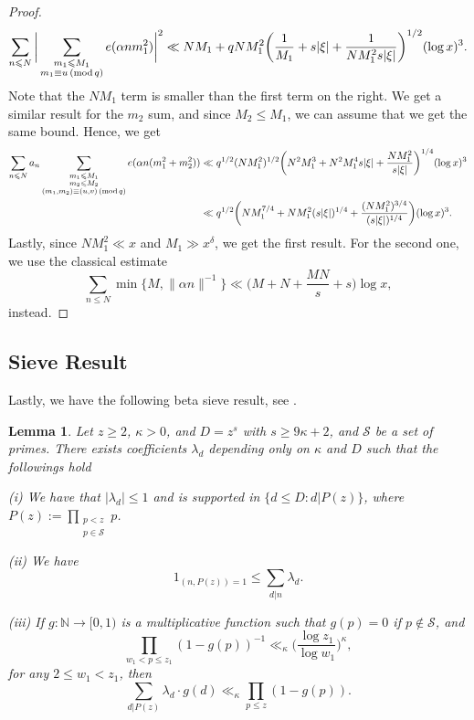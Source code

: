 \documentclass[12pt]{amsart}
\newtheorem{lem}[thm]{Lemma}
\theoremstyle{definition}
\theoremstyle{definition}
\theoremstyle{remark}
\numberwithin{equation}{section}
\newcommand{\N}{\mathbb{N}}
\newcommand{\CS}{\mathcal{S}}
\renewcommand{\geq}{\geqslant}
\renewcommand{\leq}{\leqslant}
\renewcommand{\mod}[1]{\,({\rm mod}\,#1)}
\begin{document}
\begin{proof}
$$ \sum_{n\leq N} \bigg|\sum_{\substack{m_1\leq M_1 \\ m_1\equiv u\mod q}} e(\alpha nm_1^2) \bigg|^2  \ll NM_1 + qNM_1^2 \bigg( \frac{1}{M_1} + s|\xi| + \frac{1}{NM_1^2 s|\xi|}\bigg)^{1/2} (\log x)^3. $$
Note that the $NM_1$ term is smaller than the first term on the right. We get a similar result for the $m_2$ sum, and since $M_2\leq M_1$, we can assume that we get the same bound. Hence, we get
\begin{align*}
\sum_{n\leq N} a_n \sum_{\substack{m_1\leq M_1 \\ m_2\leq M_2 \\ (m_1,m_2)\equiv (u,v)\mod q}} e(\alpha n(m_1^2+m_2^2)) &\ll q^{1/2} ( N M_1^2)^{1/2} \bigg( N^2M_1^3 + N^2M_1^4 s|\xi| + \frac{NM_1^2}{s|\xi|}  \bigg)^{1/4} (\log x)^3 \\
&\ll q^{1/2} \bigg( N M_1^{7/4} + N M_1^2 (s|\xi|)^{1/4} + \frac{(NM_1^2)^{3/4}}{(s|\xi|)^{1/4}} \bigg) (\log x)^3.
\end{align*}
Lastly, since $NM_1^2 \ll x$ and $M_1\gg x^{\delta}$, we get the first result. For the second one, we use the classical estimate
$$ \sum_{n\leq N} \min\{M , \|\alpha n \|^{-1}\} \ll \bigg(M+N+\frac{MN}{s} + s \bigg) \log x ,$$
instead.
\end{proof}


\subsection{Sieve Result}
Lastly, we have the following beta sieve result, see \cite[Fundamental Lemma 6.8]{MR2061214}.
\begin{lem}\label{sieve_lemma}
Let $z\geq 2$, $\kappa>0$, and $D=z^s$ with $s\geq 9\kappa + 2$, and $\CS$ be a set of primes. There exists coefficients $\lambda_d$ depending only on $\kappa$ and $D$ such that the followings hold

(i) We have that $|\lambda_d|\leq 1$ and is supported in $\{d\leq D : d|P(z)\}$, where $P(z):=\prod_{\substack{p<z \\ p\in \CS}} p$.

(ii) We have 
$$1_{(n,P(z))=1} \leq \sum_{d|n}\lambda_d.$$

(iii) If $g:\N\to [0,1)$ is a multiplicative function such that $g(p)=0$ if $p\not\in \CS$, and
$$ \prod_{w_1 < p \leq z_1} (1 - g(p))^{-1} \ll_{\kappa} \bigg(\frac{\log z_1}{\log w_1}\bigg)^{\kappa}, $$
for any $2\leq w_1 < z_1$, then
$$ \sum_{d|P(z)} \lambda_d \cdot g(d) \ll_{\kappa} \prod_{p\leq z} (1 - g(p) ). $$
\end{lem}
\end{document}
